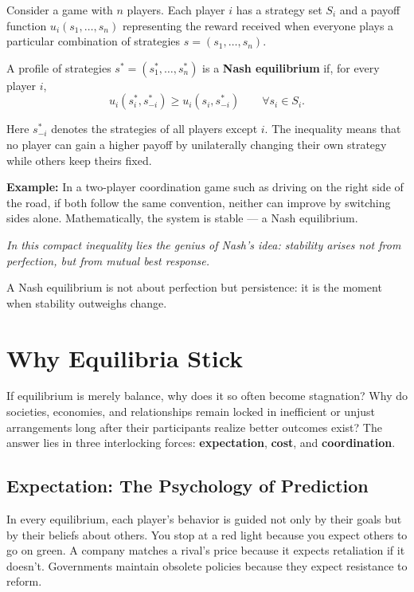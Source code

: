 \documentclass[12pt,twoside]{book}
\begin{document}
\begin{tcolorbox}[colback=gray!5,colframe=gray!60,boxrule=0.4pt,arc=1mm,
title=Mathematical Interlude: Defining Nash Equilibrium]

Consider a game with $n$ players.  
Each player $i$ has a strategy set $S_i$ and a payoff function $u_i(s_1,\dots,s_n)$ representing the reward received when everyone plays a particular combination of strategies $s=(s_1,\dots,s_n)$.

A profile of strategies $s^*=(s_1^*,\dots,s_n^*)$ is a \textbf{Nash equilibrium} if, for every player $i$,
\[
  u_i(s_i^*, s_{-i}^*) \ge u_i(s_i, s_{-i}^*) 
  \qquad \forall s_i \in S_i.
\]

Here $s_{-i}^*$ denotes the strategies of all players except $i$.  
The inequality means that no player can gain a higher payoff by unilaterally changing their own strategy while others keep theirs fixed.

\smallskip
\textbf{Example:}  
In a two-player coordination game such as driving on the right side of the road, if both follow the same convention, neither can improve by switching sides alone.  
Mathematically, the system is stable — a Nash equilibrium.

\end{tcolorbox}

\textit{In this compact inequality lies the genius of Nash’s idea: stability arises not from perfection, but from mutual best response.} \\

\begin{keyidea}
A Nash equilibrium is not about perfection but persistence: it is the moment when stability outweighs change.
\end{keyidea}

\section{Why Equilibria Stick}

If equilibrium is merely balance, why does it so often become stagnation?  
Why do societies, economies, and relationships remain locked in inefficient or unjust arrangements long after their participants realize better outcomes exist?  
The answer lies in three interlocking forces: \textbf{expectation}, \textbf{cost}, and \textbf{coordination}.

\subsection*{Expectation: The Psychology of Prediction}
In every equilibrium, each player’s behavior is guided not only by their goals but by their beliefs about others.  
You stop at a red light because you expect others to go on green.  
A company matches a rival’s price because it expects retaliation if it doesn’t.  
Governments maintain obsolete policies because they expect resistance to reform.  
\end{document}
